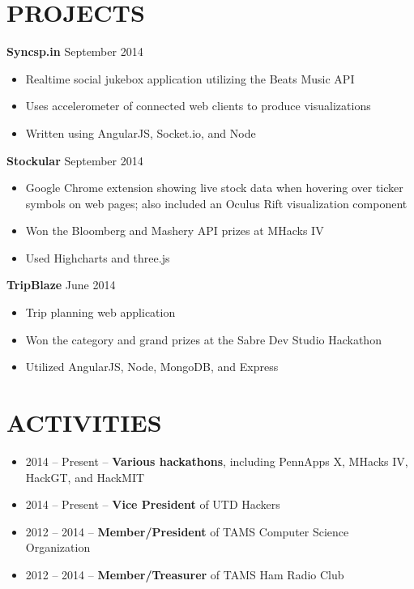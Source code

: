 \documentclass[margin, 10pt]{res} %
\begin{document}
\begin{resume}
  \section{PROJECTS}

  \textbf{Syncsp.in} \hfill September 2014

  \begin{itemize} \itemsep -2pt
    \item Realtime social jukebox application utilizing the Beats Music API
    \item Uses accelerometer of connected web clients to produce visualizations
    \item Written using AngularJS, Socket.io, and Node
  \end{itemize}

  \textbf{Stockular} \hfill September 2014

  \begin{itemize} \itemsep -2pt
    \item Google Chrome extension showing live stock data when hovering over ticker symbols on web pages; also included an Oculus Rift visualization component
    \item Won the Bloomberg and Mashery API prizes at MHacks IV
    \item Used Highcharts and three.js
  \end{itemize}

  \textbf{TripBlaze} \hfill June 2014

  \begin{itemize} \itemsep -2pt
    \item Trip planning web application
    \item Won the category and grand prizes at the Sabre Dev Studio Hackathon
    \item Utilized AngularJS, Node, MongoDB, and Express
  \end{itemize}

  \section{ACTIVITIES} 

  \begin{itemize} \itemsep -2pt
    \item 2014 -- Present -- \textbf{Various hackathons}, including PennApps X, MHacks IV, HackGT, and HackMIT
    \item 2014 -- Present -- \textbf{Vice President} of UTD Hackers
    \item 2012 -- 2014 -- \textbf{Member/President} of TAMS Computer Science Organization
    \item 2012 -- 2014 -- \textbf{Member/Treasurer} of TAMS Ham Radio Club
  \end{itemize}

\end{resume}
\end{document}
